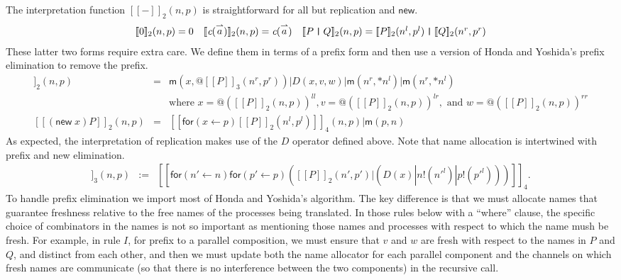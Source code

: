 \documentclass[submission,copyright,creativecommons]{eptcs}
\makeatletter
\newcommand{\new}{\mathsf{new}}
\newcommand{\ldb}{[\![}
\newcommand{\rdb}{]\!]}
\newcommand{\id}[1]{\texttt{#1}}
\newcommand{\pzero}{\mathbin{0}}
\newcommand{\juxtap}{\mathbin{\id{|}}}
\newcommand{\binpar}[2]{#1 | #2}
\newcommand{\outputp}[2]{#1!(#2)}
\newcommand{\prefix}[3]{\mathsf{for}(#2 \leftarrow #1) #3}
\newcommand{\quotep}[1]{\mathsf{@}#1}
\newcommand{\meaningof}[1]{\ldb #1 \rdb}
\newcommand{\vect}[1]{\stackrel{\rightharpoonup}{#1}}
\theoremstyle{definition}
\theoremstyle{remark}
\theoremstyle{remark}
\makeatother
\begin{document}
The interpretation function $\meaningof{-}_2(n, p)$ is straightforward
for all but replication and $\mathsf{new}$.
\[\begin{array}{ccc}
\meaningof{\pzero}_2 (n,p) = \pzero & \meaningof{\emph{c}(\vect{a})}_2 (n,p) = \emph{c}(\vect{a}) & \meaningof{P \juxtap Q}_2 (n,p)  =  \meaningof{P}_2 (n^l, p^l) \juxtap \meaningof{Q}_2 (n^r, p^r)  
\end{array}\]
These latter two forms require extra care. We define them in terms of
a prefix form and then use a version of Honda and Yoshida's prefix elimination
to remove the prefix.
\begin{eqnarray*}
    \meaningof{\mathsf{*} P}_2 (n,p)
          & = & \binpar{\mathsf{m}(x, \quotep{\meaningof{P}_3(n^r,p^r)})}
                  {\binpar{D(x,v,w)}
                    {\binpar{\mathsf{m}(n^r, *n^l)}{\mathsf{m}(n^r, *n^l)}}} \\
                  & & \mbox{where } 
                      x = @(\meaningof{P}_2(n,p))^{ll}, 
                      v = @(\meaningof{P}_2(n,p))^{lr}, \mbox{ and }
                      w = @(\meaningof{P}_2(n,p))^{rr} \\
    \meaningof{(\new \; x ) P}_2 (n, p) 
          & = & 
         \binpar{\meaningof{\prefix{p}{x}{{\meaningof{P}_2 ( n^l, p^l )}}}_4(n, p)}{\mathsf{m}(p, n)}
\end{eqnarray*}
As expected, the interpretation of replication makes use of the $D$
operator defined above. Note that name allocation is intertwined with
prefix and new elimination.
\begin{eqnarray*}
  \meaningof{P}_3(n, p) 
    & := & 
      \meaningof{\prefix{n}{n'}{\prefix{p}{p'}{(\binpar{\meaningof{P}_2(n',p')}
        {(\binpar{D(x)}{\binpar{\outputp{n}{n'^l}}{\outputp{p}{p'^l}}})})}}}_4. \end{eqnarray*}
To handle prefix elimination we import most of Honda and Yoshida's
algorithm. The key difference is that we must allocate names that
guarantee freshness relative to the free names of the processes being
translated. In those rules below with a ``where'' clause, the specific
choice of combinators in the names is not so important as mentioning
those names and processes with respect to which the name mush be fresh.
For example, in rule $I$, for prefix to a parallel
composition, we must ensure that $v$ and $w$ are fresh with respect to
the names in $P$ and $Q$, and distinct from each other, and then we
must update both the name allocator for each parallel component and
the channels on which fresh names are communicate (so that there is no
interference between the two components) in the recursive call. 
\end{document}
